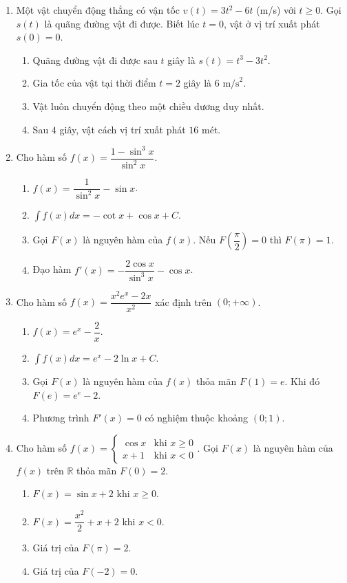 \documentclass[12pt]{article}
\begin{document}
\begin{enumerate}[label=\textbf{Câu \arabic*.}, start=1]
		\item Một vật chuyển động thẳng có vận tốc $v(t) = 3t^2 - 6t$ (m/s) với $t \ge 0$. Gọi $s(t)$ là quãng đường vật đi được. Biết lúc $t=0$, vật ở vị trí xuất phát $s(0)=0$.
		\begin{enumerate}[label=\alph*)]
			\item Quãng đường vật đi được sau $t$ giây là $s(t) = t^3 - 3t^2$.
			\item Gia tốc của vật tại thời điểm $t = 2$ giây là $6 \text{ m/s}^2$.
			\item Vật luôn chuyển động theo một chiều dương duy nhất.
			\item Sau $4$ giây, vật cách vị trí xuất phát $16$ mét.
		\end{enumerate}
		
		\item Cho hàm số $f(x) = \dfrac{1 - \sin^3 x}{\sin^2 x}$.
		\begin{enumerate}[label=\alph*)]
			\item $f(x) = \dfrac{1}{\sin^2 x} - \sin x$.
			\item $\displaystyle \int f(x) dx = -\cot x + \cos x + C$.
			\item Gọi $F(x)$ là nguyên hàm của $f(x)$. Nếu $F\left(\dfrac{\pi}{2}\right) = 0$ thì $F(\pi) = 1$.
			\item Đạo hàm $f'(x) = -\dfrac{2\cos x}{\sin^3 x} - \cos x$.
		\end{enumerate}
		
		\item Cho hàm số $f(x) = \dfrac{x^2 e^x - 2x}{x^2}$ xác định trên $(0; +\infty)$.
		\begin{enumerate}[label=\alph*)]
			\item $f(x) = e^x - \dfrac{2}{x}$.
			\item $\displaystyle \int f(x) dx = e^x - 2\ln x + C$.
			\item Gọi $F(x)$ là nguyên hàm của $f(x)$ thỏa mãn $F(1) = e$. Khi đó $F(e) = e^e - 2$.
			\item Phương trình $F'(x) = 0$ có nghiệm thuộc khoảng $(0; 1)$.
		\end{enumerate}
		
		\item Cho hàm số $f(x) = \begin{cases} \cos x & \text{khi } x \ge 0 \\ x + 1 & \text{khi } x < 0 \end{cases}$. Gọi $F(x)$ là nguyên hàm của $f(x)$ trên $\mathbb{R}$ thỏa mãn $F(0) = 2$.
		\begin{enumerate}[label=\alph*)]
			\item $F(x) = \sin x + 2$ khi $x \ge 0$.
			\item $F(x) = \dfrac{x^2}{2} + x + 2$ khi $x < 0$.
			\item Giá trị của $F(\pi) = 2$.
			\item Giá trị của $F(-2) = 0$.
		\end{enumerate}
		

\end{enumerate}
\end{document}
